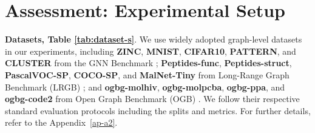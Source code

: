 
\section{Assessment: Experimental Setup}



\textbf{Datasets, Table \ref{tab:dataset-s}}. We use widely adopted graph-level datasets in our experiments, including \textbf{ZINC}, \textbf{MNIST}, \textbf{CIFAR10}, \textbf{PATTERN}, and \textbf{CLUSTER} from the GNN Benchmark \cite{dwivedi2023benchmarking}; \textbf{Peptides-func}, \textbf{Peptides-struct}, \textbf{PascalVOC-SP}, \textbf{COCO-SP}, and \textbf{MalNet-Tiny} from Long-Range Graph Benchmark (LRGB) \cite{dwivedi2022long,freitas2021large}; and \textbf{ogbg-molhiv}, \textbf{ogbg-molpcba}, \textbf{ogbg-ppa}, and \textbf{ogbg-code2} from Open Graph Benchmark (OGB) \cite{hu2020open}. 
We follow their respective standard evaluation protocols including the splits and metrics. For further details, refer to the Appendix~\ref{ap-a2}.




